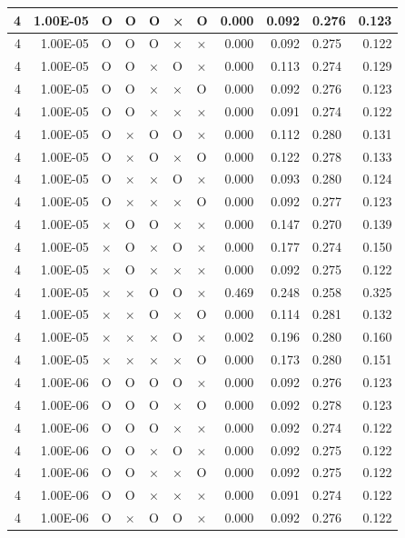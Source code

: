 \documentclass[11pt]{article}
\begin{document}
\begin{longtable}[h]{|r|r|l|l|l|l|l|r|r|l|r|}
4 & 1.00E-05 & O & O & O & × & O & 0.000 & 0.092 & 0.276 & 0.123 \\ \hline
4 & 1.00E-05 & O & O & O & × & × & 0.000 & 0.092 & 0.275 & 0.122 \\ \hline
4 & 1.00E-05 & O & O & × & O & × & 0.000 & 0.113 & 0.274 & 0.129 \\ \hline
4 & 1.00E-05 & O & O & × & × & O & 0.000 & 0.092 & 0.276 & 0.123 \\ \hline
4 & 1.00E-05 & O & O & × & × & × & 0.000 & 0.091 & 0.274 & 0.122 \\ \hline
4 & 1.00E-05 & O & × & O & O & × & 0.000 & 0.112 & 0.280 & 0.131 \\ \hline
4 & 1.00E-05 & O & × & O & × & O & 0.000 & 0.122 & 0.278 & 0.133 \\ \hline
4 & 1.00E-05 & O & × & × & O & × & 0.000 & 0.093 & 0.280 & 0.124 \\ \hline
4 & 1.00E-05 & O & × & × & × & O & 0.000 & 0.092 & 0.277 & 0.123 \\ \hline
4 & 1.00E-05 & × & O & O & × & × & 0.000 & 0.147 & 0.270 & 0.139 \\ \hline
4 & 1.00E-05 & × & O & × & O & × & 0.000 & 0.177 & 0.274 & 0.150 \\ \hline
4 & 1.00E-05 & × & O & × & × & × & 0.000 & 0.092 & 0.275 & 0.122 \\ \hline
4 & 1.00E-05 & × & × & O & O & × & 0.469 & 0.248 & 0.258 & 0.325 \\ \hline
4 & 1.00E-05 & × & × & O & × & O & 0.000 & 0.114 & 0.281 & 0.132 \\ \hline
4 & 1.00E-05 & × & × & × & O & × & 0.002 & 0.196 & 0.280 & 0.160 \\ \hline
4 & 1.00E-05 & × & × & × & × & O & 0.000 & 0.173 & 0.280 & 0.151 \\ \hline
4 & 1.00E-06 & O & O & O & O & × & 0.000 & 0.092 & 0.276 & 0.123 \\ \hline
4 & 1.00E-06 & O & O & O & × & O & 0.000 & 0.092 & 0.278 & 0.123 \\ \hline
4 & 1.00E-06 & O & O & O & × & × & 0.000 & 0.092 & 0.274 & 0.122 \\ \hline
4 & 1.00E-06 & O & O & × & O & × & 0.000 & 0.092 & 0.275 & 0.122 \\ \hline
4 & 1.00E-06 & O & O & × & × & O & 0.000 & 0.092 & 0.275 & 0.122 \\ \hline
4 & 1.00E-06 & O & O & × & × & × & 0.000 & 0.091 & 0.274 & 0.122 \\ \hline
4 & 1.00E-06 & O & × & O & O & × & 0.000 & 0.092 & 0.276 & 0.122 \\ \hline

\end{longtable}
\end{document}
